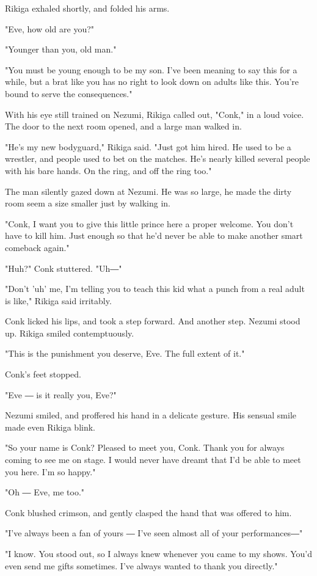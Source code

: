 Rikiga exhaled shortly, and folded his arms.

"Eve, how old are you?"

"Younger than you, old man."

"You must be young enough to be my son. I've been meaning to say this
for a while, but a brat like you has no right to look down on adults
like this. You're bound to serve the consequences."

With his eye still trained on Nezumi, Rikiga called out, "Conk," in a
loud voice. The door to the next room opened, and a large man walked in.

"He's my new bodyguard," Rikiga said. "Just got him hired. He used to be
a wrestler, and people used to bet on the matches. He's nearly killed
several people with his bare hands. On the ring, and off the ring too."

The man silently gazed down at Nezumi. He was so large, he made the
dirty room seem a size smaller just by walking in.

"Conk, I want you to give this little prince here a proper welcome. You
don't have to kill him. Just enough so that he'd never be able to make
another smart comeback again."

"Huh?" Conk stuttered. "Uh―"

"Don't 'uh' me, I'm telling you to teach this kid what a punch from a
real adult is like," Rikiga said irritably.

Conk licked his lips, and took a step forward. And another step. Nezumi
stood up. Rikiga smiled contemptuously.

"This is the punishment you deserve, Eve. The full extent of it."

Conk's feet stopped.

"Eve ― is it really you, Eve?"

Nezumi smiled, and proffered his hand in a delicate gesture. His sensual
smile made even Rikiga blink.

"So your name is Conk? Pleased to meet you, Conk. Thank you for always
coming to see me on stage. I would never have dreamt that I'd be able to
meet you here. I'm so happy."

"Oh ― Eve, me too."

Conk blushed crimson, and gently clasped the hand that was offered to
him.

"I've always been a fan of yours ― I've seen almost all of your
performances―"

"I know. You stood out, so I always knew whenever you came to my shows.
You'd even send me gifts sometimes. I've always wanted to thank you
directly."

